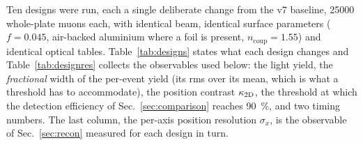 \documentclass[11pt,a4paper]{article}
\newcommand{\kap}{\ensuremath{\kappa_{\rm 2D}}}
\begin{document}
Ten designs were run, each a single deliberate change from the v7 baseline,
\num{25000} whole-plate muons each, with identical beam, identical surface
parameters ($f=\num{0.045}$, air-backed aluminium where a foil is present,
$n_{\text{coup}}=\num{1.55}$) and identical optical tables.
Table~\ref{tab:designs} states what each design changes and
Table~\ref{tab:designres} collects the observables used below: the light
yield, the \emph{fractional} width of the per-event yield (its rms over its
mean, which is what a threshold has to accommodate), the position contrast
\kap, the threshold at which the detection efficiency of
Sec.~\ref{sec:comparison} reaches \SI{90}{\percent}, and two timing numbers.
The last column, the per-axis position resolution $\sigma_x$, is the
observable of Sec.~\ref{sec:recon} measured for each design in turn.
\end{document}
